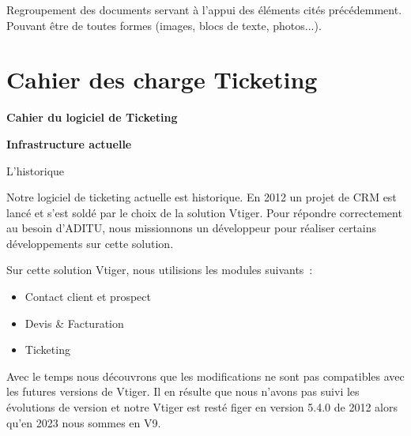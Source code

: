 
Regroupement des documents servant à l'appui des éléments cités précédemment. Pouvant être de toutes formes (images, blocs de texte, photos...).



\section{Cahier des charge Ticketing}


\textbf{Cahier du logiciel de Ticketing}

\textbf{Infrastructure actuelle}

L'historique

Notre logiciel de ticketing actuelle est historique. En 2012 un projet
de CRM est lancé et s'est soldé par le choix de la solution Vtiger. Pour
répondre correctement au besoin d'ADITU, nous missionnons un développeur
pour réaliser certains développements sur cette solution.

Sur cette solution Vtiger, nous utilisions les modules suivants~:

\begin{itemize}
\item
  Contact client et prospect
\item
  Devis \& Facturation
\item
  Ticketing
\end{itemize}

Avec le temps nous découvrons que les modifications ne sont pas
compatibles avec les futures versions de Vtiger. Il en résulte que nous
n'avons pas suivi les évolutions de version et notre Vtiger est resté
figer en version 5.4.0 de 2012 alors qu'en 2023 nous sommes en V9.

